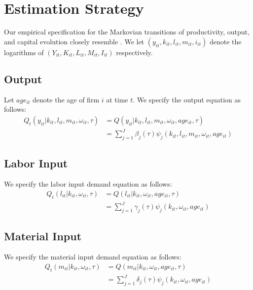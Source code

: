 \documentclass{article}
\begin{document}

\section{Estimation Strategy}

Our empirical specification for the Markovian transitions of productivity, output, and capital evolution closely resemble \cite{Arellano2017}. We let $(y_{it}, k_{it}, l_{it}, m_{it}, i_{it})$ denote the logarithms of $(Y_{it}, K_{it}, L_{it}, M_{it}, I_{it})$ respectively.

\subsection{Output}
Let $age_{it}$ denote the age of firm $i$ at time $t$. We specify the output equation as follows:
\begin{equation}\label{ymodel}
\begin{split}
Q_{t}(y_{it}|k_{it}, l_{it}, m_{it}, \omega_{it}, \tau)&=Q(y_{it}|k_{it}, l_{it}, m_{it}, \omega_{it}, age_{it}, \tau)\\
&=\sum_{j=1}^{J}\beta_{j}(\tau)\psi_{j}(k_{it}, l_{it}, m_{it}, \omega_{it}, age_{it})
\end{split}
\end{equation}

\subsection{Labor Input}
We specify the labor input demand equation as follows:
\begin{equation} \label{lmodel}
\begin{split}
Q_{t}(l_{it}|k_{it}, \omega_{it}, \tau)&=Q(l_{it}|k_{it}, \omega_{it}, age_{it}, \tau)\\
&=\sum_{j=1}^{J}\gamma_{j}(\tau)\psi_{j}(k_{it}, \omega_{it}, age_{it})
\end{split}
\end{equation}

\subsection{Material Input}
We specify the material input demand equation as follows:
\begin{equation}\label{mmodel}
\begin{split}
Q_{t}(m_{it}|k_{it}, \omega_{it}, \tau)&=Q(m_{it}|k_{it}, \omega_{it}, age_{it}, \tau)\\
&=\sum_{j=1}^{J}\delta_{j}(\tau)\psi_{j}(k_{it}, \omega_{it}, age_{it})
\end{split}
\end{equation}
\end{document}
